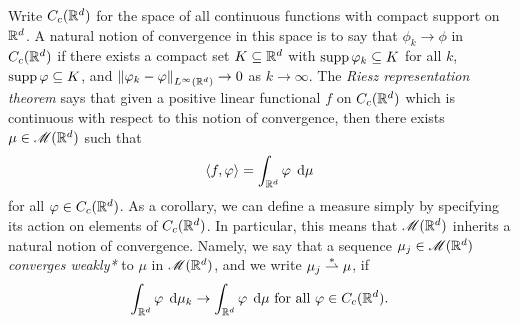 Write $C_c(\mathbb{R}^d)$ for the space of all continuous functions with compact support on $\mathbb{R}^d$. A natural notion of convergence in this space is to say that $\phi_k \rightarrow \phi$ in $C_c(\mathbb{R}^d)$ if there exists a compact set $K \subseteq \mathbb{R}^d$ with $\operatorname{supp}{\varphi_k} \subseteq K$ for all $k$, $\operatorname{supp}{\varphi} \subseteq K$, and $\left\Vert {\varphi_k - \varphi} \right\Vert_{L^\infty(\mathbb{R}^d)} \rightarrow 0$ as $k \rightarrow \infty$.  The \textit{Riesz representation theorem} says that given a positive linear functional $f$ on $C_c(\mathbb{R}^d)$ which is continuous with respect to this notion of convergence, then there exists $\mu \in \mathscr{M}(\mathbb{R}^d)$ such that 
\begin{equation}
    \left\langle f, \varphi \right\rangle = \int_{\mathbb{R}^d} \varphi \; \operatorname{d}\!{\mu}
\end{equation}
for all $\varphi \in C_c(\mathbb{R}^d)$. As a corollary, we can define a measure simply by specifying its action on elements of $C_c(\mathbb{R}^d)$. In particular, this means that $\mathscr{M}(\mathbb{R}^d)$ inherits a natural notion of convergence. Namely, we say that a sequence $\mu_j \in \mathscr{M}(\mathbb{R}^d)$ \textit{converges weakly*} to $\mu$ in $\mathscr{M}(\mathbb{R}^d)$, and we write $\mu_j \overset{\ast}{\rightharpoonup} \mu$, if
\begin{equation}
    \int_{\mathbb{R}^d} \varphi \; \operatorname{d}\!{\mu}_k \rightarrow \int_{\mathbb{R}^d} \varphi \; \operatorname{d}\!{\mu} \text{ for all } \varphi \in C_c(\mathbb{R}^d).
\end{equation}

